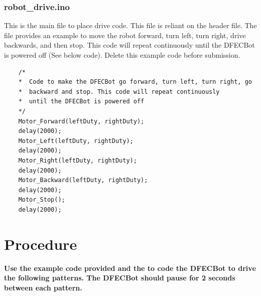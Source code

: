 \documentclass{handout}
\begin{document}
	\subsubsection{robot\_drive.ino}
	This is the main file to place drive code. This file is reliant on the  header file. The  file provides an example to move the robot forward, turn left, turn right, drive backwards, and then stop. This code will repeat continuously until the DFECBot is powered off (See below code). Delete this example code before submission.
	

	\begin{lstlisting}
	/* 
	*  Code to make the DFECBot go forward, turn left, turn right, go 
	*  backward and stop. This code will repeat continuously 
	*  until the DFECBot is powered off
	*/
	Motor_Forward(leftDuty, rightDuty);
	delay(2000);
	Motor_Left(leftDuty, rightDuty);
	delay(2000);
	Motor_Right(leftDuty, rightDuty);
	delay(2000);
	Motor_Backward(leftDuty, rightDuty);
	delay(2000);
	Motor_Stop();
	delay(2000);
	\end{lstlisting}

	\section{Procedure}
	\textbf{Use the example code provided and the  to code the DFECBot to drive the following patterns. The DFECBot should pause for 2 seconds between each pattern.}
		
\end{document}
